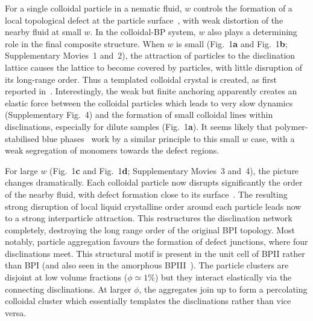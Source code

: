 \documentclass[12pt]{article}
\begin{document}
For a single colloidal particle in a nematic fluid, $w$ controls the formation of a local topological defect at the particle surface~\cite{stark}, with weak distortion of the nearby fluid at small $w$. In the colloidal-BP system, $w$ also plays a determining role in the final composite structure. When $w$ is small
(Fig.~1\textbf{a} and Fig.~1\textbf{b}; Supplementary Movies~1 and~2),
the attraction of particles to the disclination lattice causes
 the lattice to become covered by particles, with little disruption of its
 long-range order. Thus a templated colloidal crystal is created, as first reported in~\cite{miha}. Interestingly, the weak but finite anchoring apparently creates an elastic force between the colloidal particles which leads to very slow dynamics
(Supplementary Fig.~4) and the formation of small colloidal lines within disclinations, especially for dilute samples (Fig.~1\textbf{a}). It seems likely that polymer-stabilised  blue phases~\cite{kikuchi} work by a similar principle to this small $w$ case, with a weak segregation of monomers towards the defect regions.

For large $w$ (Fig.~1\textbf{c} and Fig.~1\textbf{d};
Supplementary Movies~3 and~4), the picture changes
dramatically.
Each colloidal particle now disrupts significantly the order of the nearby fluid, with defect formation close to its surface~\cite{stark}. The resulting strong disruption of local liquid crystalline order around each particle leads now to 
a strong interparticle attraction. This restructures the disclination
network completely, destroying the long range order of
the original BPI topology. Most notably, particle aggregation favours
the formation of defect junctions, where four disclinations meet. This structural motif is present in the unit cell of BPII rather than BPI (and also seen in the amorphous BPIII~\cite{bp3}). The particle clusters are disjoint at low volume fractions ($\phi\simeq 1\%$) but they interact elastically via the connecting disclinations. At larger $\phi$, the aggregates join up to form a percolating colloidal cluster which essentially templates the disclinations rather than vice versa. 
\end{document}
